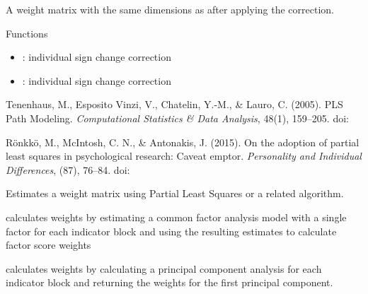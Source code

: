 \documentclass[a4paper]{book}
\begin{document}
%
\begin{Value}
A weight matrix with the same dimensions as  after applying the correction.
\end{Value}
%
\begin{Section}{Functions}
\begin{itemize}

\item{} : individual sign change correction

\item{} : individual sign change correction

\end{itemize}
\end{Section}
%
\begin{References}\relax
Tenenhaus, M., Esposito Vinzi, V., Chatelin, Y.-M., \& Lauro, C. (2005). PLS Path Modeling.
\emph{Computational Statistics \& Data Analysis}, 48(1), 159–205. 
doi:\nobreakspace{}

Rönkkö, M., McIntosh, C. N., \& Antonakis, J. (2015). On the adoption of 
partial least squares in psychological research: Caveat emptor. 
\emph{Personality and Individual Differences}, (87), 76–84.
doi:\nobreakspace{}
\end{References}
%
\begin{SeeAlso}\relax
{}
\end{SeeAlso}
%
\begin{Description}\relax
Estimates a weight matrix using Partial Least Squares or a related algorithm.

 calculates weights by estimating a common factor analysis model with a single factor for each 
indicator block and using the resulting estimates to calculate factor score weights

 calculates weights by calculating a principal component analysis for each 
indicator block and returning the weights for the first principal component.
\end{Description}
\end{document}
